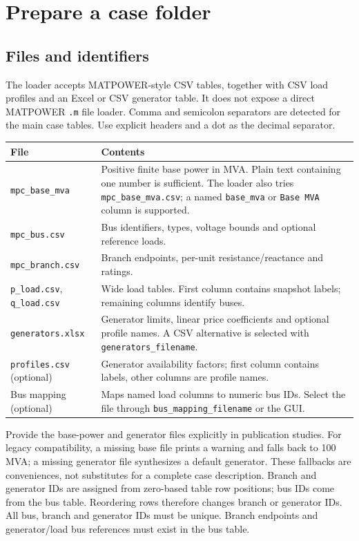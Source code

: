 \documentclass[11pt,a4paper]{article}
\newcommand{\code}[1]{\nolinkurl{#1}}
\begin{document}
\section{Prepare a case folder}
\label{sec:data}
\subsection{Files and identifiers}
The loader accepts MATPOWER-style CSV tables, together with CSV load profiles
and an Excel or CSV generator table. It does not expose a direct MATPOWER
\code{.m} file loader. Comma and semicolon separators are detected for the
main case tables. Use explicit headers and a dot as the decimal separator.

\begin{longtable}{p{.27\linewidth}p{.65\linewidth}}
\toprule File & Contents \\\midrule\endhead
\code{mpc_base_mva} & Positive finite base power in MVA. Plain text containing one number is sufficient. The loader also tries \code{mpc_base_mva.csv}; a named \code{base_mva} or \code{Base MVA} column is supported.\\
\code{mpc_bus.csv} & Bus identifiers, types, voltage bounds and optional reference loads.\\
\code{mpc_branch.csv} & Branch endpoints, per-unit resistance/reactance and ratings.\\
\code{p_load.csv}, \code{q_load.csv} & Wide load tables. First column contains snapshot labels; remaining columns identify buses.\\
\code{generators.xlsx} & Generator limits, linear price coefficients and optional profile names. A CSV alternative is selected with \code{generators_filename}.\\
\code{profiles.csv} (optional) & Generator availability factors; first column contains labels, other columns are profile names.\\
Bus mapping (optional) & Maps named load columns to numeric bus IDs. Select the file through \code{bus_mapping_filename} or the GUI.\\
\bottomrule
\end{longtable}

Provide the base-power and generator files explicitly in publication studies.
For legacy compatibility, a missing base file prints a warning and falls back
to 100 MVA; a missing generator file synthesizes a default generator. These
fallbacks are conveniences, not substitutes for a complete case description.
Branch and generator IDs are assigned from zero-based table row positions;
bus IDs come from the bus table. Reordering rows therefore changes branch or
generator IDs. All bus, branch and generator IDs must be unique. Branch
endpoints and generator/load bus references must exist in the bus table.
\end{document}
